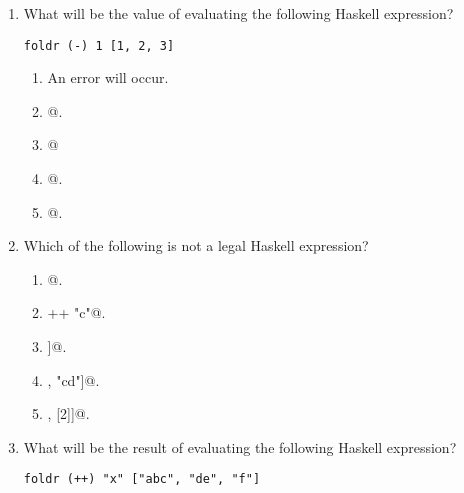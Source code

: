 \documentclass[12pt]{article}
\begin{document}
\begin{enumerate}
\begin{enumerate}
\item {}@
  
\item {}@.

\item {}@.

  
\end{enumerate}


\item What will be the value of evaluating the following Haskell
  expression?

\begin{verbatim}
foldr (-) 1 [1, 2, 3]
\end{verbatim}

\begin{enumerate}

\item An error will occur.

\item {}@.

\item {}@
  
\item {}@.

\item {}@.

\end{enumerate}

\newpage

\item Which of the following is not a legal Haskell expression?

\begin{enumerate}

\item \verb@[1, 2, 3]@.

\item \verb@['a', 'b'] ++ "c"@.

\item \verb@[1, 2, [1]]@.

\item \verb@[['a', 'b'], "cd"]@.

\item \verb@[[1], [2]]@.

\end{enumerate}


\item What will be the result of evaluating the following Haskell expression?

\begin{verbatim}
foldr (++) "x" ["abc", "de", "f"] 
\end{verbatim}


\end{enumerate}
\end{document}
